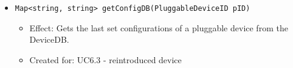 {{{\begin{itemize}
\begin{itemize}
                        \begin{itemize}
                            \item Effect: Changes the status of a pluggable device to 'active'.
                            \item Created for: UC6.3 - reintroduced device
                        \end{itemize}
                    \item \texttt{Map<string, string> getConfigDB(PluggableDeviceID pID)}
                        \begin{itemize}
                            \item Effect: Gets the last set configurations of a pluggable device from the DeviceDB.
                            \item Created for: UC6.3 - reintroduced device
                        \end{itemize}
                \end{itemize}


\end{itemize}}}}
